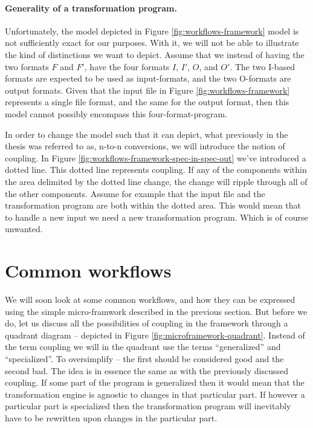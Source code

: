 \documentclass{scrreprt}
\begin{document}
\paragraph{Generality of a transformation program.}
Unfortunately, the model depicted in Figure \ref{fig:workflows-framework} model is not sufficiently exact for our purposes. With it, we will not be able to illustrate the kind of distinctions we want to depict. Assume that we instead of having the two formats \(F\) and \(F\prime\), have the four formats \(I\), \(I\prime\), \(O\), and \(O\prime\). The two I-based formats are expected to be used as input-formats, and the two O-formats are output formats. Given that the input file in Figure \ref{fig:workflows-framework} represents a single file format, and the same for the output format, then this model cannot possibly encompass this four-format-program.

In order to change the model such that it can depict, what previously in the thesis was referred to as, n-to-n conversions, we will introduce the notion of coupling. In Figure \ref{fig:workflows-framework-spec-in-spec-out} we've introduced a dotted line. This dotted line represents coupling. If any of the components within the area delimited by the dotted line change, the change will ripple through all of the other components. Assume for example that the input file and the transformation program are both within the dotted area. This would mean that to handle a new input we need a new transformation program. Which is of course unwanted.







\section{Common workflows}
We will soon look at some common workflows, and how they can be expressed using the simple micro-framwork described in the previous section. But before we do, let us discuss all the possibilities of coupling in the framework through a quadrant diagram -- depicted in Figure \ref{fig:microframework-quadrant}. Instead of the term coupling we will in the quadrant use the terms ``generalized'' and ``specialized''. To oversimplify -- the first should be considered good and the second bad. The idea is in essence the same as with the previously discussed coupling. If some part of the program is generalized then it would mean that the transformation engine is agnostic to changes in that particular part. If however a particular part is specialized then the transformation program will inevitably have to be rewritten upon changes in the particular part. 
\end{document}
